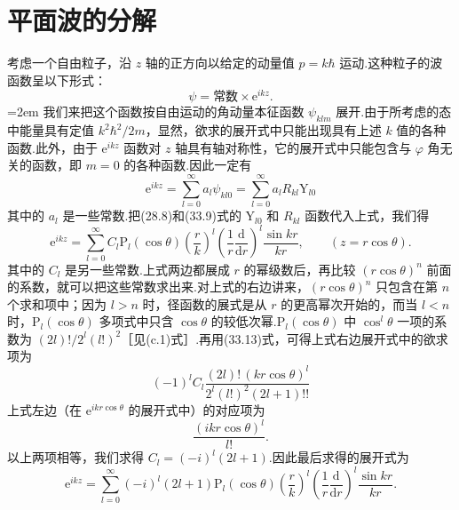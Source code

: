 \section{平面波的分解}

考虑一个自由粒子，沿 $z$ 轴的正方向以给定的动量值 $p=k\hbar$ 运动.这种粒子的波函数呈以下形式：
\begin{equation*}
  \psi=\text{常数}\times\mathrm{e}^{ikz}.
\end{equation*}
\emergencystretch=2em%
我们来把这个函数按自由运动的角动量本征函数 $\psi_{klm}$ 展开.由于所考虑的态中能量具有定值 $k^2\hbar^2/2m$，显然，欲求的展开式中只能出现具有上述 $k$ 值的各种函数.此外，由于 $\mathrm{e}^{ikz}$ 函数对 $z$ 轴具有轴对称性，它的展开式中只能包含与 $\varphi$ 角无关的函数，即 $m=0$ 的各种函数.因此一定有
\begin{equation*}
  \mathrm{e}^{ikz}=\sum_{l=0}^{\infty}a_l\psi_{kl0}
  =\sum_{l=0}^{\infty}a_lR_{kl}\mathrm{Y}_{l0}
\end{equation*}
\emergencystretch=0pt%
其中的 $a_l$ 是一些常数.把(28.8)和(33.9)式的 $\mathrm{Y}_{l0}$ 和 $R_{kl}$ 函数代入上式，我们得
\begin{equation*}
  \mathrm{e}^{ikz}=\sum_{l=0}^{\infty}C_l\mathrm{P}_l(\cos\theta)
  \left(\frac{r}{k}\right)^l\left(\frac{1}{r}\frac{\mathrm{d}}{\mathrm{d}r}\right)^l
  \frac{\sin kr}{kr},\qquad(z=r\cos\theta).
\end{equation*}
其中的 $C_l$ 是另一些常数.上式两边都展成 $r$ 的幂级数后，再比较 $(r\cos\theta)^n$ 前面的系数，就可以把这些常数求出来.对上式的右边讲来，$(r\cos\theta)^n$ 只包含在第 $n$ 个求和项中；因为 $l>n$ 时，径函数的展式是从 $r$ 的更高幂次开始的，而当 $l<n$ 时，$\mathrm{P}_l(\cos\theta)$ 多项式中只含 $\cos\theta$ 的较低次幂.$\mathrm{P}_l(\cos\theta)$ 中 $\cos^l\theta$ 一项的系数为 $(2l)!/2^l(l!)^2$［见(c.1)式］.再用(33.13)式，可得上式右边展开式中的欲求项为
\begin{equation*}
  (-1)^lC_l\frac{(2l)!\,(kr\cos\theta)^l}{2^l(l!)^2(2l+1)!!}
\end{equation*}
上式左边（在 $\mathrm{e}^{ikr\cos\theta}$ 的展开式中）的对应项为
\begin{equation*}
  \frac{(ikr\cos\theta)^l}{l!}.
\end{equation*}
以上两项相等，我们求得 $C_l=(-i)^l(2l+1)$.因此最后求得的展开式为
\begin{equation}
  \mathrm{e}^{ikz}=\sum_{l=0}^{\infty}(-i)^l(2l+1)\mathrm{P}_l(\cos\theta)
  \left(\frac{r}{k}\right)^l\left(\frac{1}{r}\frac{\mathrm{d}}{\mathrm{d}r}\right)^l
  \frac{\sin kr}{kr}.
\end{equation}
